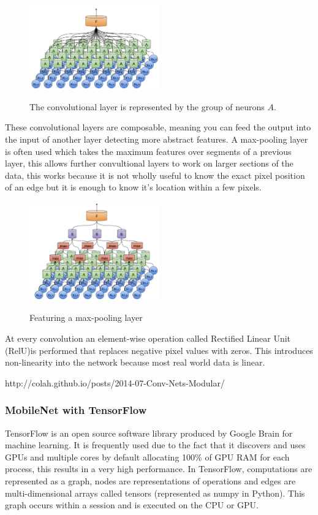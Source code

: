 \documentclass{mproj}
\begin{document}
\begin{figure}[h]
  \caption{The convolutional layer is represented by the group of neurons $A$.}
  \centering
  \includegraphics[width=0.5\textwidth]{images/conv.png}
  \label{fig:Basic CNN diagram}
\end{figure}

These convolutional layers are composable, meaning you can feed the output into the input of another layer detecting more abstract features. A max-pooling layer is often used which takes the maximum features over segments of a previous layer, this allows further convultional layers to work on larger sections of the data, this works because it is not wholly useful to know the exact pixel position of an edge but it is enough to know it's location within a few pixels.
 
\begin{figure}[h]
  \caption{Featuring a max-pooling layer}
  \centering
  \includegraphics[width=0.5\textwidth]{images/conv_max.png}
  \label{fig:Basic CNN with Max-pooling diagram}
\end{figure}

At every convolution an element-wise operation called Rectified Linear Unit (RelU)is performed that replaces negative pixel values with zeros. This introduces non-linearity into the network because most real world data is linear.

http://colah.github.io/posts/2014-07-Conv-Nets-Modular/

\subsubsection{MobileNet with TensorFlow}
TensorFlow is an open source software library produced by Google Brain for machine learning. It is frequently used due to the fact that it discovers and uses GPUs and multiple cores by default allocating 100\% of GPU RAM for each process, this results in a very high performance. In TensorFlow, computations are represented as a graph, nodes are representations of operations and edges are multi-dimensional arrays called tensors (represented as numpy in Python). This graph occurs within a session and is executed on the CPU or GPU. 
  
\end{document}

